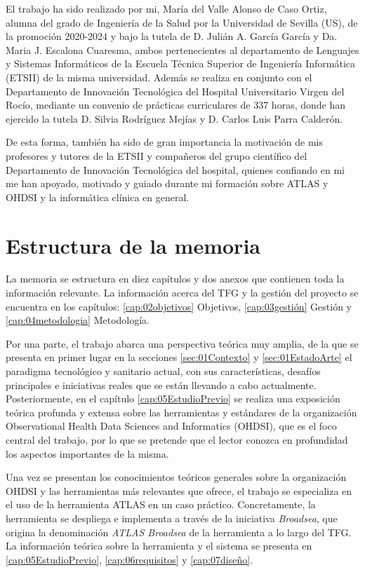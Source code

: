 El trabajo ha sido realizado por mi, María del Valle Alonso de Caso Ortiz, alumna del grado de Ingeniería de la Salud por la Universidad de Sevilla (US), de la promoción 2020-2024 y bajo la tutela de D. Julián A. García García y Da. Maria J. Escalona Cuaresma, ambos pertenecientes al departamento de Lenguajes y Sistemas Informáticos de la Escuela Técnica Superior de Ingeniería Informática (ETSII) de la misma universidad. Además se realiza en conjunto con el Departamento de Innovación Tecnológica del Hospital Universitario Virgen del Rocío, mediante un convenio de prácticas curriculares de 337 horas, donde han ejercido la tutela D. Silvia Rodríguez Mejías y D. Carlos Luis Parra Calderón. 

De esta forma, también ha sido de gran importancia la motivación de mis profesores y tutores de la ETSII y compañeros del grupo científico del Departamento de Innovación Tecnológica del hospital, quienes confiando en mi me han apoyado, motivado y guiado durante mi formación sobre ATLAS y OHDSI y la informática clínica en general.

\section{Estructura de la memoria} \label{sec:01Intro}

La memoria se estructura en diez capítulos y dos anexos que contienen toda la información relevante. La información acerca del TFG y la gestión del proyecto se encuentra en los capítulos: \ref{cap:02objetivos} Objetivos, \ref{cap:03gestión} Gestión  y \ref{cap:04metodologia} Metodología.

Por una parte, el trabajo abarca una perspectiva teórica muy amplia, de la que se presenta en primer lugar en la secciones \ref{sec:01Contexto} y \ref{sec:01EstadoArte} el paradigma tecnológico y sanitario actual, con sus características, desafíos principales e iniciativas reales que se están llevando a cabo actualmente. Posteriormente, en el capítulo \ref{cap:05EstudioPrevio} se realiza una exposición teórica profunda y extensa sobre las herramientas y estándares de la organización Observational Health Data Sciences and Informatics (OHDSI), que es el foco central del trabajo, por lo que se pretende que el lector conozca en profundidad los aspectos importantes de la misma.

Una vez se presentan los conocimientos teóricos generales sobre la organización OHDSI y las herramientas más relevantes que ofrece, el trabajo se especializa en el uso de la herramienta ATLAS en un caso práctico. Concretamente, la herramienta se despliega e implementa a través de la iniciativa \textit{Broadsea}, que origina la denominación \textit{ATLAS Broadsea} de la herramienta a lo largo del TFG. La información teórica sobre la herramienta y el sistema se presenta en \ref{cap:05EstudioPrevio}, \ref{cap:06requisitos} y \ref{cap:07diseño}.

